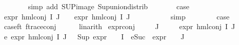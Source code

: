 \begin{isabellebody}
\ \ \ \ \ \ \isamarkupfalse%
\ {\isacharparenleft}{\kern0pt}simp\ add{\isacharcolon}{\kern0pt}\ SUP{\isacharunderscore}{\kern0pt}image\ Sup{\isacharunderscore}{\kern0pt}union{\isacharunderscore}{\kern0pt}distrib{\isacharparenright}{\kern0pt}\isanewline
\ \ \ \ \isamarkupfalse%
\ \isamarkupfalse%
\ {\isacharquery}{\kern0pt}case\ \isamarkupfalse%
\ {\isacartoucheopen}expr{\isacharunderscore}{\kern0pt}{}\ {\isacharparenleft}{\kern0pt}hml{\isacharunderscore}{\kern0pt}conj\ I\ J\ {\isasymPhi}{\isacharparenright}{\kern0pt}\ {\isasymle}\ {}{\isacartoucheclose}\ {\isacartoucheopen}expr{\isacharunderscore}{\kern0pt}{}\ {\isacharparenleft}{\kern0pt}hml{\isacharunderscore}{\kern0pt}conj\ I\ J\ {\isasymPhi}{\isacharparenright}{\kern0pt}\ {\isasymle}\ {}{\isacartoucheclose}\isanewline
\ \ \ \ \ \ \isamarkupfalse%
\ simp\isanewline
\ \ \isamarkupfalse%
\isanewline
\ \ \isamarkupfalse%
\ \isamarkupfalse%
\ {\isacharquery}{\kern0pt}case\ \isamarkupfalse%
\ case{\isacharunderscore}{\kern0pt}ft\ f{\isacharunderscore}{\kern0pt}trace{\isacharunderscore}{\kern0pt}conj\isanewline
\ \ \ \ \isamarkupfalse%
\ linarith\isanewline
{}\isamarkupfalse%
%
\endisatagproof
{\isafoldproof}%
%
\isadelimproof
\isanewline
%
\endisadelimproof
\isanewline
{}\isamarkupfalse%
\ expr{\isacharunderscore}{\kern0pt}{}{\isacharunderscore}{\kern0pt}conj{\isacharcolon}{\kern0pt}\isanewline
\ \ \ {\isachardoublequoteopen}{\isacharparenleft}{\kern0pt}{\isasymPhi}\ {\isacharbackquote}{\kern0pt}\ J{\isacharparenright}{\kern0pt}\ {\isasymnoteq}\ {\isacharbraceleft}{\kern0pt}{\isacharbraceright}{\kern0pt}{\isachardoublequoteclose}\isanewline
\ \ \ {\isachardoublequoteopen}expr{\isacharunderscore}{\kern0pt}{}\ {\isacharparenleft}{\kern0pt}hml{\isacharunderscore}{\kern0pt}conj\ I\ J\ {\isasymPhi}{\isacharparenright}{\kern0pt}\ {\isasymge}\ {}{\isachardoublequoteclose}\isanewline
%
\isadelimproof
%
\endisadelimproof
%
\isatagproof
{}\isamarkupfalse%
{\isacharminus}{\kern0pt}\isanewline
\ \ \isamarkupfalse%
\ e{}{\isacharcolon}{\kern0pt}\ {\isachardoublequoteopen}expr{\isacharunderscore}{\kern0pt}{}\ {\isacharparenleft}{\kern0pt}hml{\isacharunderscore}{\kern0pt}conj\ I\ J\ {\isasymPhi}{\isacharparenright}{\kern0pt}\ {\isacharequal}{\kern0pt}\ {\isacharparenleft}{\kern0pt}Sup\ {\isacharparenleft}{\kern0pt}{\isacharparenleft}{\kern0pt}expr{\isacharunderscore}{\kern0pt}{}\ {\isasymcirc}\ {\isasymPhi}{\isacharparenright}{\kern0pt}\ {\isacharbackquote}{\kern0pt}\ I\ {\isasymunion}\ {\isacharparenleft}{\kern0pt}{\isacharparenleft}{\kern0pt}eSuc\ {\isasymcirc}\ expr{\isacharunderscore}{\kern0pt}{}\ {\isasymcirc}\ {\isasymPhi}{\isacharparenright}{\kern0pt}\ {\isacharbackquote}{\kern0pt}\ J{\isacharparenright}{\kern0pt}{\isacharparenright}{\kern0pt}{\isacharparenright}{\kern0pt}{\isachardoublequoteclose}\isanewline

\end{isabellebody}
